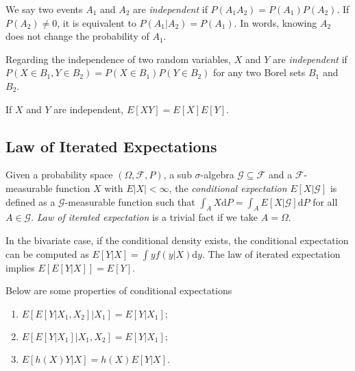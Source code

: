 \documentclass[11pt]{article}
\providecommand{\tightlist}{%
      \setlength{\itemsep}{0pt}\setlength{\parskip}{0pt}}
\begin{document}
We say two events \(A_1\) and \(A_2\) are \emph{independent} if
\(P(A_1A_2) = P(A_1)P(A_2)\). If \(P(A_2) \neq 0\), it is equivalent to
\(P(A_1 | A_2 ) = P(A_1)\). In words, knowing \(A_2\) does not change
the probability of \(A_1\).

Regarding the independence of two random variables, \(X\) and \(Y\) are
\emph{independent} if
\(P\left(X\in B_1,Y\in B_2\right)=P\left(X\in B_1\right)P\left(Y\in B_2\right)\)
for any two Borel sets \(B_1\) and \(B_2\).

If \(X\) and \(Y\) are independent, \(E[XY] = E[X]E[Y]\).

    \subsection{Law of Iterated
Expectations}\label{law-of-iterated-expectations}

Given a probability space \(\left(\Omega,\mathcal{F},P\right)\), a sub
\(\sigma\)-algebra \(\mathcal{G}\subseteq \mathcal{F}\) and a
\(\mathcal{F}\)-measurable function \(X\) with
\(E\left|X\right|<\infty\), the \emph{conditional expectation}
\(E\left[X|\mathcal{G}\right]\) is defined as a
\(\mathcal{G}\)-measurable function such that
\(\int_{A}X \mathrm{d} P=\int_{A}E\left[X|\mathcal{G}\right] \mathrm{d} P\)
for all \(A\in\mathcal{G}\). \emph{Law of iterated expectation} is a
trivial fact if we take \(A=\Omega\).

In the bivariate case, if the conditional density exists, the
conditional expectation can be computed as
\(E\left[Y|X\right]=\int y f\left(y|X\right) \mathrm{d} y\). The law of
iterated expectation implies
\(E\left[E\left[Y|X\right]\right]=E\left[Y\right]\).

Below are some properties of conditional expectations

\begin{enumerate}
\def\labelenumi{\arabic{enumi}.}
\tightlist
\item
  \(E\left[E\left[Y|X_{1},X_{2}\right]|X_{1}\right]=E\left[Y|X_{1}\right];\)
\item
  \(E\left[E\left[Y|X_{1}\right]|X_{1},X_{2}\right]=E\left[Y|X_{1}\right];\)
\item
  \(E\left[h\left(X\right)Y|X\right]=h\left(X\right)E\left[Y|X\right].\)
\end{enumerate}


    
    
    
    
\end{document}

